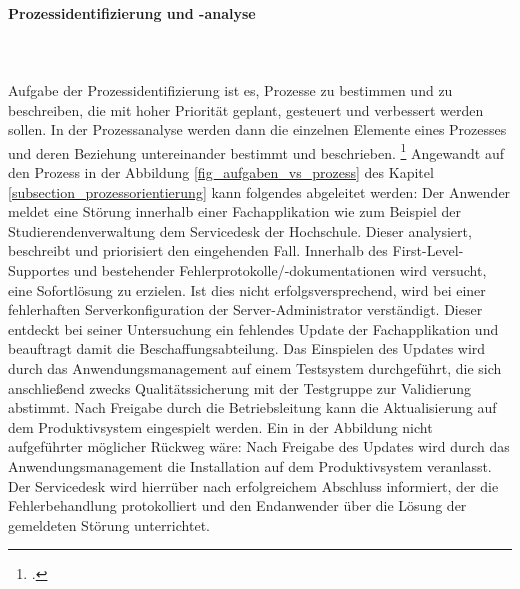 \paragraph{Prozessidentifizierung und -analyse}\mbox{}\\\\
\label{paragraph_prozessidenifizierung}
Aufgabe der Prozessidentifizierung ist es, Prozesse zu bestimmen und zu beschreiben, die mit hoher Priorität geplant, gesteuert und verbessert werden sollen. In der Prozessanalyse werden dann die einzelnen Elemente eines Prozesses und deren Beziehung untereinander bestimmt und beschrieben. \footcite[Vgl.][276]{heinrich_stelzer_2011}
Angewandt auf den Prozess in der Abbildung \ref{fig_aufgaben_vs_prozess} des Kapitel \ref{subsection_prozessorientierung} kann folgendes abgeleitet werden:
Der Anwender meldet eine Störung innerhalb einer Fachapplikation wie zum Beispiel der Studierendenverwaltung dem Servicedesk der Hochschule. Dieser analysiert, beschreibt und priorisiert den eingehenden Fall. Innerhalb des First-Level-Supportes und bestehender Fehlerprotokolle/-dokumentationen wird versucht, eine Sofortlösung zu erzielen. Ist dies nicht erfolgsversprechend, wird bei einer fehlerhaften Serverkonfiguration der Server-Administrator verständigt. Dieser entdeckt bei seiner Untersuchung ein fehlendes Update der Fachapplikation und beauftragt damit die Beschaffungsabteilung. Das Einspielen des Updates wird durch das Anwendungsmanagement auf einem Testsystem durchgeführt, die sich anschließend zwecks Qualitätssicherung mit der Testgruppe zur Validierung abstimmt. Nach Freigabe durch die Betriebsleitung kann die Aktualisierung auf dem Produktivsystem eingespielt werden.
Ein in der Abbildung nicht aufgeführter möglicher Rückweg wäre: Nach Freigabe des Updates wird durch das Anwendungsmanagement die Installation auf dem Produktivsystem veranlasst. Der Servicedesk wird hierrüber nach erfolgreichem Abschluss informiert, der die Fehlerbehandlung protokolliert und den Endanwender über die Lösung der gemeldeten Störung unterrichtet. 


